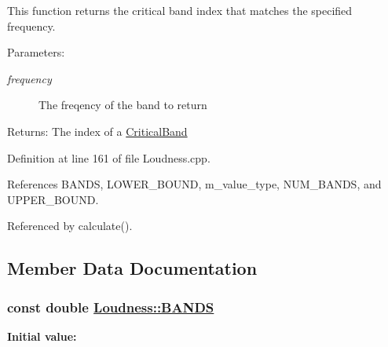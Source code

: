 This function returns the critical band index that matches the specified frequency. \begin{Desc}
\item[Parameters:]
\begin{description}
\item[{\em frequency}]The freqency of the band to return \end{description}
\end{Desc}
\begin{Desc}
\item[Returns:]The index of a \hyperlink{classLoudness_1_1CriticalBand}{Critical\-Band} \end{Desc}


Definition at line 161 of file Loudness.cpp.

References BANDS, LOWER\_\-BOUND, m\_\-value\_\-type, NUM\_\-BANDS, and UPPER\_\-BOUND.

Referenced by calculate().

\subsection{Member Data Documentation}
\hypertarget{classLoudness_v7}{
\subsubsection[BANDS]{\setlength{\rightskip}{0pt plus 5cm}const  double \hyperlink{classLoudness_v7}{Loudness::BANDS}}}
\label{classLoudness_v7}


{\bf Initial value:}

